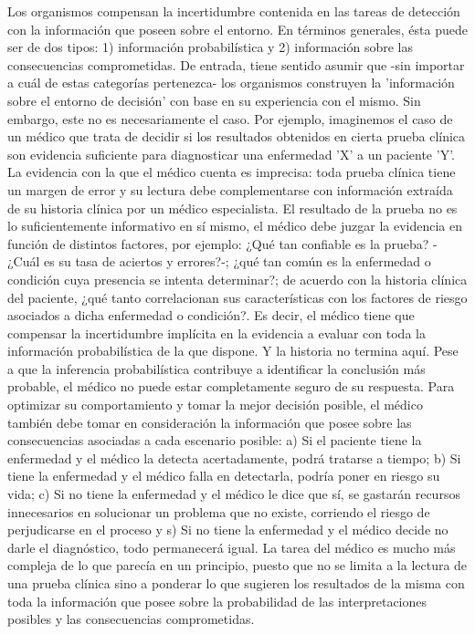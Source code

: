 Los organismos compensan la incertidumbre contenida en las tareas de detección con la información que poseen sobre el entorno. En términos generales, ésta puede ser de dos tipos: 1) información probabilística y 2) información sobre las consecuencias comprometidas. De entrada, tiene sentido asumir que -sin importar a cuál de estas categorías pertenezca- los organismos construyen la 'información sobre el entorno de decisión' con base en su experiencia con el mismo. Sin embargo, este no es necesariamente el caso. Por ejemplo, imaginemos el caso de un médico que trata de decidir si los resultados obtenidos en cierta prueba clínica son evidencia suficiente para diagnosticar una enfermedad 'X' a un paciente 'Y'. La evidencia con la que el médico cuenta es imprecisa: toda prueba clínica tiene un margen de error y su lectura debe complementarse con información extraída de su historia clínica por un médico especialista. El resultado de la prueba no es lo suficientemente informativo en sí mismo, el médico debe juzgar la evidencia en función de distintos factores, por ejemplo: ¿Qué tan confiable es la prueba? -¿Cuál es su tasa de aciertos y errores?-; ¿qué tan común es la enfermedad o condición cuya presencia se intenta determinar?; de acuerdo con la historia clínica del paciente, ¿qué tanto correlacionan sus características con los factores de riesgo asociados a dicha enfermedad o condición?. Es decir, el médico tiene que compensar la incertidumbre implícita en la evidencia a evaluar con toda la información probabilística de la que dispone. Y la historia no termina aquí.  Pese a que la inferencia probabilística contribuye a identificar la conclusión más probable, el médico no puede estar completamente seguro de su respuesta. Para optimizar su comportamiento y tomar la mejor decisión posible, el médico también debe tomar en consideración la información que posee sobre las consecuencias asociadas a cada escenario posible: a) Si el paciente tiene la enfermedad y el médico la detecta acertadamente, podrá tratarse a tiempo; b) Si tiene la enfermedad y el médico falla en detectarla, podría poner en riesgo su vida; c) Si no tiene la enfermedad y el médico le dice que sí, se gastarán recursos innecesarios en solucionar un problema que no existe, corriendo el riesgo de perjudicarse en el proceso y s) Si no tiene la enfermedad y el médico decide no darle el diagnóstico, todo permanecerá igual. La tarea del médico es mucho más compleja de lo que parecía en un principio, puesto que no se limita a la lectura de una prueba clínica sino a ponderar lo que sugieren los resultados de la misma con toda la información que posee sobre la probabilidad de las interpretaciones posibles y las consecuencias comprometidas.\\

